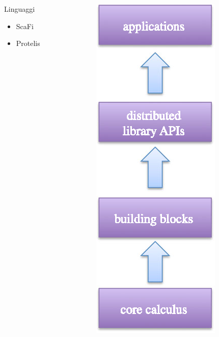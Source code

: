\begin{frame}{\insertsectionhead}{\insertsubsectionhead}
\begin{columns}
\begin{column}{.7\textwidth}
\begin{block}{Linguaggi}
              \begin{itemize}
                \item ScaFi
                \item Protelis
              \end{itemize}
            \end{block}
          \end{column}
          \begin{column}{.25\textwidth}
            \begin{figure}
              \includegraphics[height=.7\textheight]{res/fig/stack-partial.eps}
            \end{figure}
          \end{column}
        \end{columns}
      \end{frame}

